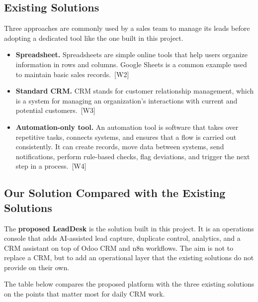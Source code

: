 \documentclass[12pt,a4paper,oneside]{report}
\begin{document}
\subsection{Existing Solutions}\label{sumlbl:c1s4ss1}
Three approaches are commonly used by a sales team to manage its leads before adopting a dedicated tool like the one built in this project.

\begin{itemize}
\item \textbf{Spreadsheet.} Spreadsheets are simple online tools that help users organize information in rows and columns. Google Sheets is a common example used to maintain basic sales records.~\textup{[W2]}
\item \textbf{Standard CRM.} CRM stands for customer relationship management, which is a system for managing an organization's interactions with current and potential customers.~\textup{[W3]}
\item \textbf{Automation-only tool.} An automation tool is software that takes over repetitive tasks, connects systems, and ensures that a flow is carried out consistently. It can create records, move data between systems, send notifications, perform rule-based checks, flag deviations, and trigger the next step in a process.~\textup{[W4]}
\end{itemize}

\subsection{Our Solution Compared with the Existing Solutions}\label{sumlbl:c1s4ss2}
The \textbf{proposed LeadDesk} is the solution built in this project. It is an operations console that adds AI-assisted lead capture, duplicate control, analytics, and a CRM assistant on top of Odoo CRM and n8n workflows. The aim is not to replace a CRM, but to add an operational layer that the existing solutions do not provide on their own.

The table below compares the proposed platform with the three existing solutions on the points that matter most for daily CRM work.
\end{document}
